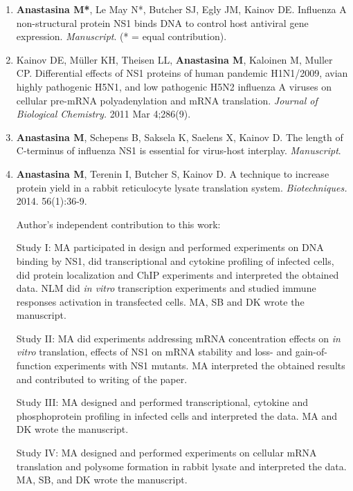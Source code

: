 \documentclass[a4paper,12pt]{article} %
\begin{document}
	\begin{enumerate}[I]

	\item \textbf{Anastasina M*}, Le May N*, Butcher SJ, Egly JM, Kainov DE. Influenza A non-structural protein NS1 binds DNA to control host antiviral gene expression. \textit{Manuscript}. (* = equal contribution). \label{DNA}	
	\item 	Kainov DE, Müller KH, Theisen LL, \textbf{Anastasina M}, Kaloinen M, Muller CP. Differential effects of NS1 proteins of human pandemic H1N1/2009, avian highly pathogenic H5N1, and low pathogenic H5N2 influenza A viruses on cellular pre-mRNA polyadenylation and mRNA translation. \textit{Journal of Biological Chemistry.} 2011 Mar 4;286(9). \label{Transl}		
	\item \textbf{Anastasina M}, Schepens B, Saksela K, Saelens X, Kainov D. The length of C-terminus of influenza NS1 is essential for virus-host interplay. \textit{Manuscript}. \label{Cterm}	
	\item \textbf{Anastasina M}, Terenin I, Butcher S, Kainov D. A technique to increase protein yield in a rabbit reticulocyte lysate translation system. \textit{Biotechniques.} 2014. 56(1):36-9. \label{RRL}
	
	\pagebreak
	Author's independent contribution to this work:
	\vspace{2 mm}
	
	Study I: MA participated in design and performed experiments on DNA binding by NS1, did transcriptional and cytokine profiling of infected cells, did protein localization and ChIP experiments and interpreted the obtained data. NLM did \textit{in vitro} transcription experiments and studied immune responses activation in transfected cells. MA, SB and DK wrote the manuscript. \vspace{2 mm}
	
	Study II: MA did experiments addressing mRNA concentration effects on \textit{in vitro} translation, effects of NS1 on mRNA stability and loss- and gain-of-function experiments with NS1 mutants. MA interpreted the obtained results and contributed to writing of the paper.\vspace{2 mm}
	
	Study III: MA designed and performed transcriptional, cytokine and phosphoprotein profiling in infected cells and interpreted the data. MA and DK wrote the manuscript.\vspace{2 mm}
	
	Study IV: MA designed and performed experiments on cellular mRNA translation and polysome formation in rabbit lysate and interpreted the data. MA, SB, and DK wrote the manuscript.
	
\end{enumerate}
\end{document}
